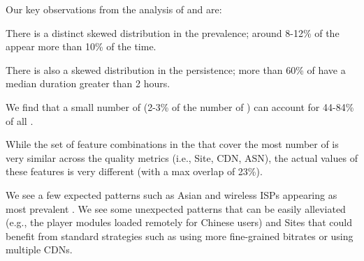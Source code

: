 Our key observations from the analysis of \problemclusters 
and  \criticalclusters  are:  

\begin{packeditemize}

\item There is a distinct skewed distribution  in the prevalence; 
around 8-12\% of the \problemclusters appear more than 
10\% of the time.

\item There is also a skewed distribution  in the persistence; 
more than 60\% of  \problemclusters have a median duration 
greater than 2 hours.  

\item We find that a small number of \criticalclusters 
(2-3\% of the number of \problemclusters) can account 
for 44-84\% of all \problemsessions. 

\item While the set of feature combinations in the 
\criticalclusters that cover the most number of 
\problemsessions is very similar across the quality
metrics (i.e., Site, CDN, ASN), the actual values of 
these features is very different (with a max overlap of 23\%). 

\item  We see a few expected patterns  such as Asian 
and wireless ISPs appearing  as most prevalent \criticalclusters. 
We  see some unexpected patterns that can be easily alleviated 
(e.g., the player modules loaded remotely for Chinese users) 
and Sites that could benefit from standard strategies such as 
using more fine-grained bitrates or using multiple CDNs.

\end{packeditemize}



